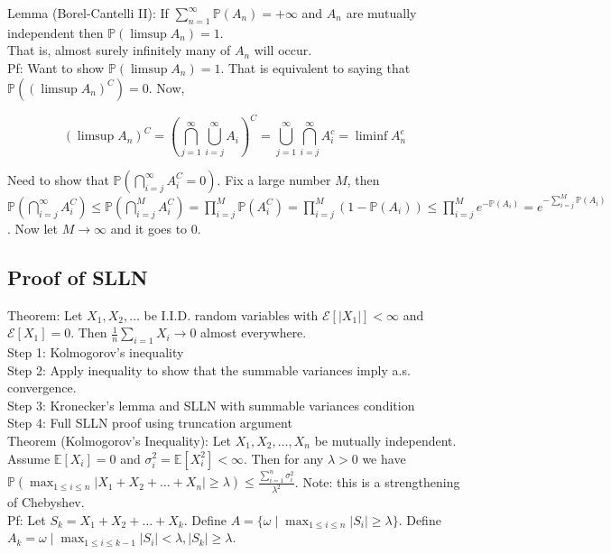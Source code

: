\documentclass[english, 11pt]{article}
\begin{document}
Lemma (Borel-Cantelli II): If $\sum_{n=1}^\infty \mathbb{P}(A_n) = +\infty$ and $A_n$ are mutually independent then $\mathbb{P}(\limsup A_n) = 1$.\\

That is, almost surely infinitely many of $A_n$ will occur.\\

Pf: Want to show $\mathbb{P}(\limsup A_n) = 1$. That is equivalent to saying that $\mathbb{P}((\limsup A_n)^C) = 0$. Now,

\[(\limsup A_n)^C = (\bigcap_{j = 1}^\infty \bigcup_{i = j}^\infty A_i)^C = \bigcup_{j = 1}^\infty \bigcap_{i = j}^\infty A_i^c = \liminf A_n^c\]

Need to show that $\mathbb{P}(\bigcap_{i = j}^\infty A_i^C = 0)$. Fix a large number $M$, then $\mathbb{P}(\bigcap_{i=j}^\infty A_i^C) \leq \mathbb{P}(\bigcap_{i = j}^M A_i^C) = \prod_{i = j}^M \mathbb{P}(A_i^C) = \prod_{i = j}^M(1 - \mathbb{P}(A_i)) \leq \prod_{i = j}^M e^{-\mathbb{P}(A_i)} = e^{-\sum_{i = j}^M \mathbb{P}(A_i)}$. Now let $M \to \infty$ and it goes to $0$.\\

\subsection{Proof of SLLN}

Theorem: Let $X_1, X_2, \dots$ be I.I.D. random variables with $\mathcal{E}[|X_1|] < \infty$ and $\mathcal{E}[X_1] = 0$. Then $\frac{1}{n} \sum_{i = 1}X_i \to 0$ almost everywhere.\\

Step 1: Kolmogorov's inequality\\
Step 2: Apply inequality to show that the summable variances imply a.s. convergence.\\
Step 3: Kronecker's lemma and SLLN with summable variances condition\\
Step 4: Full SLLN proof using truncation argument\\


Theorem (Kolmogorov's Inequality): Let $X_1, X_2, \dots, X_n$ be mutually independent. Assume $\mathbb{E}[X_i] = 0$ and $\sigma_i^2 = \mathbb{E}[X_i^2] < \infty$. Then for any $\lambda > 0$ we have $\mathbb{P}(\max_{1 \leq i \leq n} |X_1 + X_2 + \dots + X_n| \geq \lambda) \leq \frac{\sum_{i = 1}^n \sigma_i^2}{\lambda^2}$. Note: this is a strengthening of Chebyshev.\\

Pf: Let $S_k = X_1 + X_2 + \dots + X_k$. Define $A = \{\omega \mid \max_{1 \leq i \leq n} |S_i| \geq \lambda\}$. Define $A_k = \omega \mid \max_{1 \leq i \leq k-1} |S_i| < \lambda, |S_k| \geq \lambda$.\\
\end{document}
